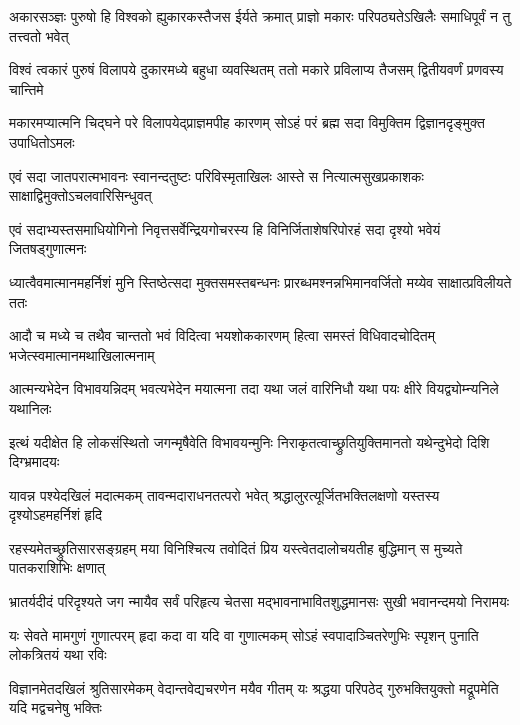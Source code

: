 \fourlineindentedshloka
{अकारसञ्ज्ञः पुरुषो हि विश्वको}
{ह्युकारकस्तैजस ईर्यते क्रमात्}
{प्राज्ञो मकारः परिपठ्यतेऽखिलैः}
{समाधिपूर्वं न तु तत्त्वतो भवेत्} %

\fourlineindentedshloka
{विश्वं त्वकारं पुरुषं विलापये\-}
{दुकारमध्ये बहुधा व्यवस्थितम्}
{ततो मकारे प्रविलाप्य तैजसम्}
{द्वितीयवर्णं प्रणवस्य चान्तिमे} %

\fourlineindentedshloka
{मकारमप्यात्मनि चिद्घने परे}
{विलापयेद्प्राज्ञमपीह कारणम्}
{सोऽहं परं ब्रह्म सदा विमुक्तिम\-}
{द्विज्ञानदृङ्मुक्त उपाधितोऽमलः} %

\fourlineindentedshloka
{एवं सदा जातपरात्मभावनः}
{स्वानन्दतुष्टः परिविस्मृताखिलः}
{आस्ते स नित्यात्मसुखप्रकाशकः}
{साक्षाद्विमुक्तोऽचलवारिसिन्धुवत्} %

\fourlineindentedshloka
{एवं सदाभ्यस्तसमाधियोगिनो}
{निवृत्तसर्वेन्द्रियगोचरस्य हि}
{विनिर्जिताशेषरिपोरहं सदा}
{दृश्यो भवेयं जितषड्गुणात्मनः} %

\fourlineindentedshloka
{ध्यात्वैवमात्मानमहर्निशं मुनि\-}
{स्तिष्ठेत्सदा मुक्तसमस्तबन्धनः}
{प्रारब्धमश्नन्नभिमानवर्जितो}
{मय्येव साक्षात्प्रविलीयते ततः} %

\fourlineindentedshloka
{आदौ च मध्ये च तथैव चान्ततो}
{भवं विदित्वा भयशोककारणम्}
{हित्वा समस्तं विधिवादचोदितम्}
{भजेत्स्वमात्मानमथाखिलात्मनाम्} %

\fourlineindentedshloka
{आत्मन्यभेदेन विभावयन्निदम्}
{भवत्यभेदेन मयात्मना तदा}
{यथा जलं वारिनिधौ यथा पयः}
{क्षीरे वियद्व्योम्न्यनिले यथानिलः} %

\fourlineindentedshloka
{इत्थं यदीक्षेत हि लोकसंस्थितो}
{जगन्मृषैवेति विभावयन्मुनिः}
{निराकृतत्वाच्छ्रुतियुक्तिमानतो}
{यथेन्दुभेदो दिशि दिग्भ्रमादयः} %

\fourlineindentedshloka
{यावन्न पश्येदखिलं मदात्मकम्}
{तावन्मदाराधनतत्परो भवेत्}
{श्रद्धालुरत्यूर्जितभक्तिलक्षणो}
{यस्तस्य दृश्योऽहमहर्निशं हृदि} %

\fourlineindentedshloka
{रहस्यमेतच्छ्रुतिसारसङ्ग्रहम्}
{मया विनिश्चित्य तवोदितं प्रिय}
{यस्त्वेतदालोचयतीह बुद्धिमान्}
{स मुच्यते पातकराशिभिः क्षणात्} %

\fourlineindentedshloka
{भ्रातर्यदीदं परिदृश्यते जग\-}
{न्मायैव सर्वं परिहृत्य चेतसा}
{मद्भावनाभावितशुद्धमानसः}
{सुखी भवानन्दमयो निरामयः} %

\fourlineindentedshloka
{यः सेवते मामगुणं गुणात्परम्}
{हृदा कदा वा यदि वा गुणात्मकम्}
{सोऽहं स्वपादाञ्चितरेणुभिः स्पृशन्}
{पुनाति लोकत्रितयं यथा रविः} %

\fourlineindentedshloka
{विज्ञानमेतदखिलं श्रुतिसारमेकम्}
{वेदान्तवेद्यचरणेन मयैव गीतम्}
{यः श्रद्धया परिपठेद् गुरुभक्तियुक्तो}
{मद्रूपमेति यदि मद्वचनेषु भक्तिः} %

